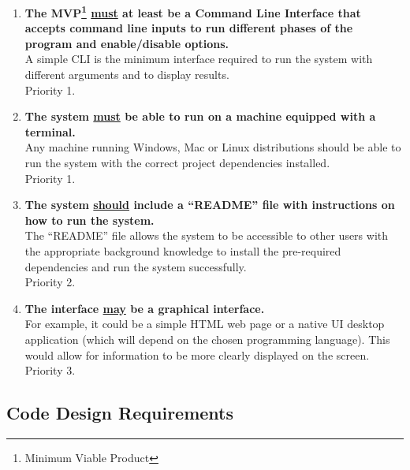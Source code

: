 \begin{enumerate}

    \item \textbf{The MVP\footnote{Minimum Viable Product} \underline{must} at least be a Command Line Interface that accepts command line inputs to run different phases of the program and enable/disable options.}\\
    A simple CLI is the minimum interface required to run the system with different arguments and to display results.\\
    Priority 1.
    
    \item \textbf{The system \underline{must} be able to run on a machine equipped with a terminal.}\\
    Any machine running Windows, Mac or Linux distributions should be able to run the system with the correct project dependencies installed.\\
    Priority 1.
        
    \item \textbf{The system \underline{should} include a ``README'' file with instructions on how to run the system.}\\
    The ``README'' file allows the system to be accessible to other users with the appropriate background knowledge to install the pre-required dependencies and run the system successfully.\\
    Priority 2.
    
    \item \textbf{The interface \underline{may} be a graphical interface.}\\
    For example, it could be a simple HTML web page or a native UI desktop application (which will depend on the chosen programming language). This would allow for information to be more clearly displayed on the screen.\\
    Priority 3.
        
\end{enumerate}

\subsection{Code Design Requirements}

